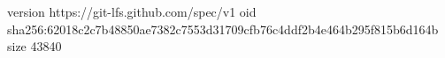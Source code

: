 version https://git-lfs.github.com/spec/v1
oid sha256:62018c2c7b48850ae7382c7553d31709cfb76c4ddf2b4e464b295f815b6d164b
size 43840
